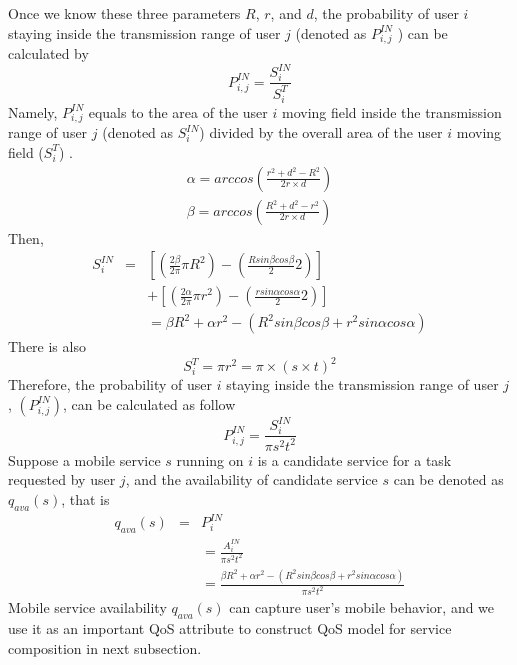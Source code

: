 \documentclass[10pt,journal,compsoc]{IEEEtran}
\begin{document}
​Once we know these three parameters $R$, $r$, and $d$, the probability of user $i$ staying inside the transmission range of user $j$ (denoted as $P_{i,j}^{IN}$ ) can be calculated by
\begin{equation}
P_{i,j}^{IN} = \frac{S_i^{IN}}{S_i^T}
\end{equation}
Namely, $P^{IN}_{i,j}$ equals to the area of the user $i$ moving field inside the transmission range of user $j$ (denoted as $S^{IN}_i$) divided by the overall area of the user $i$ moving field ($S^T_i$) .
\begin{eqnarray}
\alpha = arccos(\frac{r^2+d^2-R^2}{2r\times d}) \\\nonumber
\beta = arccos(\frac{R^2+d^2-r^2}{2r\times d})
\end{eqnarray}
Then,
\setlength{\arraycolsep}{0.0em}
\begin{eqnarray}
S^{IN}_i&{}={} &[(\frac{2\beta}{2\pi}\pi R^2)-(\frac{R sin\beta cos\beta}{2}2)]\\\nonumber
&&+ [(\frac{2\alpha}{2\pi}\pi r^2)-(\frac{r sin\alpha cos\alpha}{2}2)]\\\nonumber
&&= \beta R^2 + \alpha r^2 - (R^2 sin\beta cos\beta + r^2 sin\alpha cos\alpha)
\end{eqnarray}
\setlength{\arraycolsep}{5pt}
There is also
\begin{equation}
S_i^T = \pi r^2 = \pi \times (s \times t)^2
\end{equation}
Therefore, the probability of user $i$ staying inside the transmission range of user $j$, $(P^{IN}_{i,j})$, can be calculated as follow
\begin{equation}
P_{i,j}^{IN} = \frac{S_i^{IN}}{\pi s^2 t^2}
\end{equation}
Suppose a mobile service $s$ running on $i$ is a candidate service for a task requested by user $j$, and the availability of candidate service $s$ can be denoted as $q_{ava}(s)$, that is
\begin{eqnarray}
q_{ava}(s) &{} = {}& P^{IN}_i \\\nonumber
&& = \frac{A_i^{IN}}{\pi s^2 t^2}\\\nonumber
&& = \frac{\beta R^2 + \alpha r^2 - (R^2 sin\beta cos\beta + r^2 sin\alpha cos\alpha)}{\pi s^2 t^2}
\end{eqnarray}
Mobile service availability $q_{ava}(s)$ can capture user's mobile behavior, and we use it as an important QoS attribute to construct QoS model for service composition in next subsection.
\end{document}
